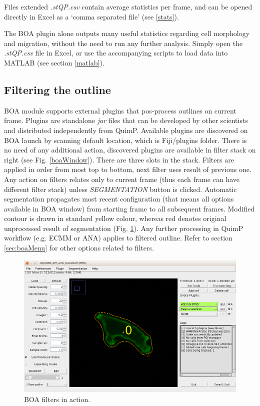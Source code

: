 \documentclass[a4paper,12pt]{article}
\begin{document}
Files extended \textit{.stQP.csv} contain average statistics per frame, and can be opened directly in 
Excel as a `comma separated file'  (see \ref{stats}).

The BOA plugin alone outputs many useful statistics regarding cell morphology and migration, without the need to run any further analysis.
Simply open the \textit{.stQP.csv} file in Excel, or use the accompanying scripts to load data into MATLAB (see section \ref{matlab}).

\subsection{Filtering the outline}
\label{sec:boaFilters}
BOA module supports external plugins that pos-process outlines on current frame. Plugins are standalone \textit{jar} files that can be developed by other scientists and distributed independently from QuimP. Available plugins are discovered on BOA launch by scanning default location, which is Fiji/plugins folder. There is no need of any additional action, discovered plugins are available in filter stack on right (see Fig. \ref{boaWindow}). There are three slots in the stack. Filters are applied in order from most top to bottom, next filter uses result of previous one. Any action on filters relates only to current frame (thus each frame can have different filter stack) unless \textit{SEGMENTATION} button is clicked. Automatic segmentation propagates most recent configuration (that means all options available in BOA window) from starting frame to all subsequent frames. Modified contour is drawn in standard yellow colour, whereas red denotes original unprocessed result of segmentation (Fig. \ref{boafilter}). Any further processing in QuimP workflow (e.g. ECMM or ANA) applies to filtered outline. Refer to section \ref{sec:boaMenu} for other options related to filters.
\begin{figure}[ht]
	\centering
	\includegraphics[height=7cm]{boafilter.png} %
	\caption{BOA filters in action.}
	\label{boafilter}
\end{figure}
\end{document}
